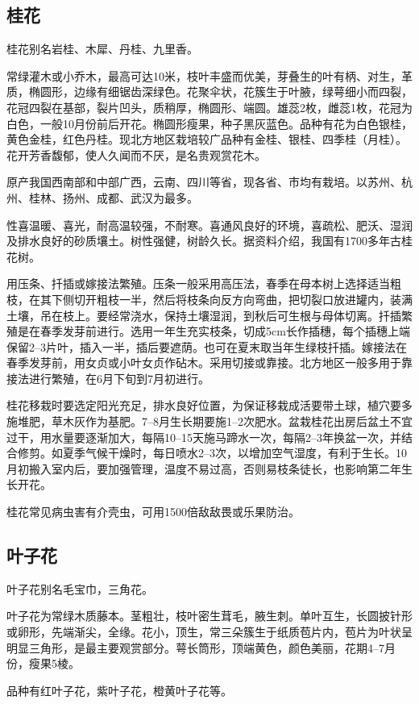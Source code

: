 \documentclass{ctexbook}
\begin{document}
\subsection{桂花}
桂花别名岩桂、木犀、丹桂、九里香。

常绿灌木或小乔木，最高可达10米，枝叶丰盛而优美，芽叠生的叶有柄、对生，革质，椭圆形，边缘有细锯齿深绿色。花聚伞状，花簇生于叶腋，绿萼细小而四裂，花冠四裂在基部，裂片凹头，质稍厚，椭圆形、端圆。雄蕊2枚，雌蕊1枚，花冠为白色，一般10月份前后开花。椭圆形瘦果，种子黑灰蓝色。品种有花为白色银桂，黄色金桂，红色丹桂。现北方地区栽培较广品种有金桂、银桂、四季桂（月桂）。花开芳香馥郁，使人久闻而不厌，是名贵观赏花木。

原产我国西南部和中部广西，云南、四川等省，现各省、市均有栽培。以苏州、杭州、桂林、扬州、成都、武汉为最多。

性喜温暖、喜光，耐高温较强，不耐寒。喜通风良好的环境，喜疏松、肥沃、湿润及排水良好的砂质壤土。树性强健，树龄久长。据资料介绍，我国有1700多年古桂花树。

用压条、扦插或嫁接法繁殖。压条一般采用高压法，春季在母本树上选择适当粗枝，在其下侧切开粗枝一半，然后将枝条向反方向弯曲，把切裂口放进罐内，装满土壤，吊在枝上。要经常浇水，保持土壤湿润，到秋后可生根与母体切离。扦插繁殖是在春季发芽前进行。选用一年生充实枝条，切成5cm长作插穗，每个插穗上端保留2--3片叶，插入一半，插后要遮荫。也可在夏末取当年生绿枝扦插。嫁接法在春季发芽前，用女贞或小叶女贞作砧木。采用切接或靠接。北方地区一般多用于靠接法进行繁殖，在6月下旬到7月初进行。

桂花移栽时要选定阳光充足，排水良好位置，为保证移栽成活要带土球，植穴要多施堆肥，草木灰作为基肥。7--8月生长期要施1--2次肥水。盆栽桂花出房后盆土不宜过干，用水量要逐渐加大，每隔10--15天施马蹄水一次，每隔2--3年换盆一次，并结合修剪。如夏季气候干燥时，每日喷水2--3次，以增加空气湿度，有利于生长。10月初搬入室内后，要加强管理，温度不易过高，否则易枝条徒长，也影响第二年生长开花。

桂花常见病虫害有介壳虫，可用1500倍敌敌畏或乐果防治。
\subsection{叶子花}
叶子花别名毛宝巾，三角花。

叶子花为常绿木质藤本。茎粗壮，枝叶密生茸毛，腋生刺。单叶互生，长圆披针形或卵形，先端渐尖，全缘。花小，顶生，常三朵簇生于纸质苞片内，苞片为叶状呈明显三角形，是最主要观赏部分。萼长筒形，顶端黄色，颜色美丽，花期4--7月份，瘦果5棱。

品种有红叶子花，紫叶子花，橙黄叶子花等。
\end{document}
